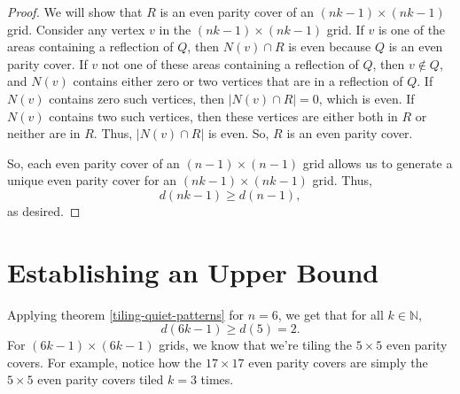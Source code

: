 \documentclass[a4paper]{article}
\newcommand{\N}{\mathbb{N}}
\newcommand{\abs}[1]{\left| #1 \right|}
\begin{document}
\begin{proof}
		We will show that $R$ is an even parity cover of an $(nk - 1) \times (nk - 1)$ grid.
		Consider any vertex $v$ in the $(nk-1) \times (nk-1)$ grid.
		If $v$ is one of the areas containing a reflection of $Q$, then $N(v) \cap R$ is even because $Q$ is an even parity cover.
		If $v$ not one of these areas containing a reflection of $Q$, then $v \not\in Q$, and $N(v)$ contains either zero or two vertices that are in a reflection of $Q$.
		If $N(v)$ contains zero such vertices, then $\abs{N(v) \cap R} = 0$, which is even.
		If $N(v)$ contains two such vertices, then these vertices are either both in $R$ or neither are in $R$.
		Thus, $\abs{N(v) \cap R}$ is even.
		So, $R$ is an even parity cover.
		
		So, each even parity cover of an $(n-1) \times (n-1)$ grid allows us to generate a unique even parity cover for an $(nk-1) \times (nk-1)$ grid.
		Thus,
		\begin{equation*}
			d(nk-1) \geq d(n-1),
		\end{equation*}
		as desired.
	\end{proof}

	\section{Establishing an Upper Bound}
	Applying theorem \ref{tiling-quiet-patterns} for $n=6$, we get that for all $k \in \N$,
	\begin{equation*}
		d(6k - 1) \geq d(5) = 2.
	\end{equation*}
	For $(6k-1) \times (6k-1)$ grids, we know that we're tiling the $5 \times5 $ even parity covers.
	For example, notice how the $17 \times 17$ even parity covers are simply the $5 \times 5$ even parity covers tiled $k=3$ times.
	
\end{document}
